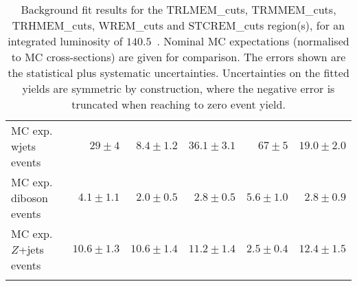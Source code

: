 \begin{table}
\begin{center}
{\begin{tabular*}{\textwidth}{@{\extracolsep{\fill}}lrrrrr}
        MC exp. wjets events         & $29 \pm 4$          & $8.4 \pm 1.2$          & $36.1 \pm 3.1$          & $67 \pm 5$          & $19.0 \pm 2.0$              \\
        MC exp. diboson events         & $4.1 \pm 1.1$          & $2.0 \pm 0.5$          & $2.8 \pm 0.5$          & $5.6 \pm 1.0$          & $2.8 \pm 0.9$              \\
        MC exp. $Z$+jets events         & $10.6 \pm 1.3$          & $10.6 \pm 1.4$          & $11.2 \pm 1.4$          & $2.5 \pm 0.4$          & $12.4 \pm 1.5$              \\
\noalign{\smallskip}\hline\noalign{\smallskip}
\end{tabular*}
}
\end{center}
\caption{ Background fit results for the TRLMEM\_cuts, TRMMEM\_cuts, TRHMEM\_cuts, WREM\_cuts and STCREM\_cuts region(s),  for an integrated luminosity of $140.5$~\ifb.
Nominal MC expectations (normalised to MC cross-sections) are given for comparison. 
The errors shown are the statistical plus systematic uncertainties.
Uncertainties on the fitted yields are symmetric by construction, 
where the negative error is truncated when reaching to zero event yield.
}
\label{table.results.yields.fit.CR}
\end{table}
%